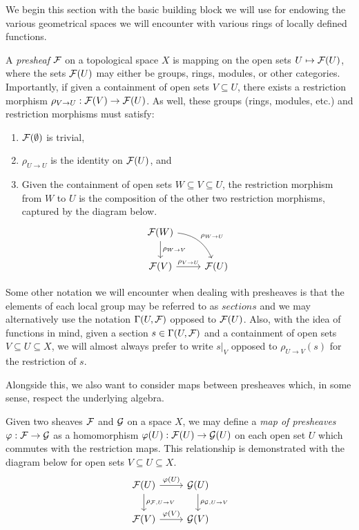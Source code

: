\documentclass[12pt]{article}
\begin{document}
We begin this section with the basic building block we will use for endowing the various geometrical spaces we will encounter with various rings of locally defined functions.

\begin{definition}[Presheaf]
    A \textit{presheaf} $\mathcal{F}$ on a topological space $X$ is mapping on the open sets $U \mapsto \mathcal{F}(U)$, 
    where the sets $\mathcal{F}(U)$ may either be groups, rings, modules, or other categories.
    Importantly, if given a containment of open sets $V \subseteq U$, 
    there exists a restriction morphism $\rho_{V \to U}: \mathcal{F}(V) \to \mathcal{F}(U)$.
    As well, these groups (rings, modules, etc.) and restriction morphisms must satisfy:
    \begin{enumerate}
        \item $\mathcal{F}(\emptyset)$ is trivial,
        \item $\rho_{U \to U}$ is the identity on $\mathcal{F}(U)$, and
        \item  Given the containment of open sets $W \subseteq V \subseteq U$, the restriction morphism from $W$ to $U$ is the composition of the other two restriction morphisms, captured by the diagram below.
        \[
            \begin{tikzcd}
                \cF(W) \arrow[d, "\rho_{W \to V}"] \arrow[dr, "\rho_{W \to U}", bend left] \\
                \cF(V) \arrow[r, "\rho_{V \to U}"] & \cF(U)
            \end{tikzcd}
        \]
    \end{enumerate}
\end{definition}

Some other notation we will encounter when dealing with presheaves is that the elements of each local group may be referred to as $\textit{sections}$
and we may alternatively use the notation $\Gamma(U, \mathcal{F})$ opposed to $\mathcal{F}(U)$.
Also, with the idea of functions in mind, given a section $s \in \Gamma(U, \mathcal{F})$ and a containment of open sets $V \subseteq U \subseteq X$,
we will almost always prefer to write $s|_V$ opposed to $\rho_{U \to V}(s)$ for the restriction of $s$.

Alongside this, we also want to consider maps between presheaves which, in some sense, respect the underlying algebra.

\begin{definition}
    Given two sheaves $\mathcal{F}$ and $\mathcal{G}$ on a space $X$, 
    we may define a \textit{map of presheaves} $\varphi : \mathcal{F} \to \mathcal{G}$ as a homomorphism $\varphi(U) : \mathcal{F}(U) \to \mathcal{G}(U)$ on each open set $U$ which commutes with the restriction maps.
    This relationship is demonstrated with the diagram below for open sets $V \subseteq U \subseteq X$.
    \[
        \begin{tikzcd}
            \cF(U) \arrow[r, "\varphi(U)"] \arrow[d, "\rho_{\cF, U \to V}"] & \cG(U) \arrow[d, "\rho_{\cG, U \to V}"] \\
            \cF(V) \arrow[r, "\varphi(V)"] & \cG(V)
        \end{tikzcd}
    \]
\end{definition}
\end{document}
